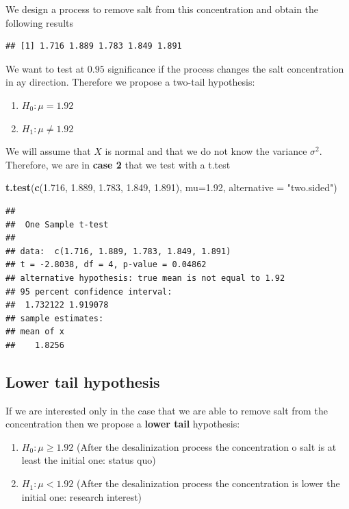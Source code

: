 \documentclass[
]{book}
\newenvironment{Shaded}{\begin{snugshade}}{\end{snugshade}}
\newcommand{\AttributeTok}[1]{\textcolor[rgb]{0.13,0.29,0.53}{#1}}
\newcommand{\FloatTok}[1]{\textcolor[rgb]{0.00,0.00,0.81}{#1}}
\newcommand{\FunctionTok}[1]{\textcolor[rgb]{0.13,0.29,0.53}{\textbf{#1}}}
\newcommand{\NormalTok}[1]{#1}
\newcommand{\StringTok}[1]{\textcolor[rgb]{0.31,0.60,0.02}{#1}}
\providecommand{\tightlist}{%
  \setlength{\itemsep}{0pt}\setlength{\parskip}{0pt}}
\begin{document}
We design a process to remove salt from this concentration and obtain the following results

\begin{verbatim}
## [1] 1.716 1.889 1.783 1.849 1.891
\end{verbatim}

We want to test at \(0.95\) significance if the process changes the salt concentration in ay direction. Therefore we propose a two-tail hypothesis:

\begin{enumerate}
\def\labelenumi{\alph{enumi}.}
\tightlist
\item
  \(H_0:\mu=1.92\)
\item
  \(H_1:\mu \neq 1.92\)
\end{enumerate}

We will assume that \(X\) is normal and that we do not know the variance \(\sigma^2\). Therefore, we are in \textbf{case 2} that we test with a t.test

\begin{Shaded}
\begin{Highlighting}[]
\FunctionTok{t.test}\NormalTok{(}\FunctionTok{c}\NormalTok{(}\FloatTok{1.716}\NormalTok{, }\FloatTok{1.889}\NormalTok{, }\FloatTok{1.783}\NormalTok{, }\FloatTok{1.849}\NormalTok{, }\FloatTok{1.891}\NormalTok{), }
       \AttributeTok{mu=}\FloatTok{1.92}\NormalTok{, }\AttributeTok{alternative =} \StringTok{"two.sided"}\NormalTok{)}
\end{Highlighting}
\end{Shaded}

\begin{verbatim}
## 
##  One Sample t-test
## 
## data:  c(1.716, 1.889, 1.783, 1.849, 1.891)
## t = -2.8038, df = 4, p-value = 0.04862
## alternative hypothesis: true mean is not equal to 1.92
## 95 percent confidence interval:
##  1.732122 1.919078
## sample estimates:
## mean of x 
##    1.8256
\end{verbatim}

\hypertarget{lower-tail-hypothesis}{%
\subsection{Lower tail hypothesis}\label{lower-tail-hypothesis}}

If we are interested only in the case that we are able to remove salt from the concentration then we propose a \textbf{lower tail} hypothesis:

\begin{enumerate}
\def\labelenumi{\alph{enumi}.}
\tightlist
\item
  \(H_0:\mu \geq 1.92\) (After the desalinization process the concentration o salt is at least the initial one: status quo)
\item
  \(H_1:\mu < 1.92\) (After the desalinization process the concentration is lower the initial one: research interest)
\end{enumerate}
\end{document}
